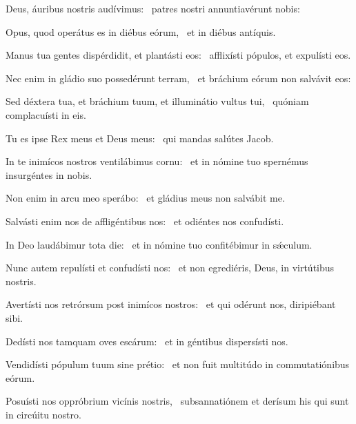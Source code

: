 \item Deus, áuribus nostris audívimus:~\psstar{} patres nostri annuntiavérunt nobis:

\item Opus, quod operátus es in diébus eórum,~\psstar{} et in diébus antíquis.

\item Manus tua gentes dispérdidit, et plantásti eos:~\psstar{} afflixísti pópulos, et expulísti eos.

\item Nec enim in gládio suo possedérunt terram,~\psstar{} et bráchium eórum non salvávit eos:

\item Sed déxtera tua, et bráchium tuum, et illuminátio vultus tui,~\psstar{} quóniam complacuísti in eis.

\item Tu es ipse Rex meus et Deus meus:~\psstar{} qui mandas salútes Jacob.

\item In te inimícos nostros ventilábimus cornu:~\psstar{} et in nómine tuo spernémus insurgéntes in nobis.

\item Non enim in arcu meo sperábo:~\psstar{} et gládius meus non salvábit me.

\item Salvásti enim nos de affligéntibus nos:~\psstar{} et odiéntes nos confudísti.

\item In Deo laudábimur tota die:~\psstar{} et in nómine tuo confitébimur in sǽculum.

\item Nunc autem repulísti et confudísti nos:~\psstar{} et non egrediéris, Deus, in virtútibus nostris.

\item Avertísti nos retrórsum post inimícos nostros:~\psstar{} et qui odérunt nos, diripiébant sibi.

\item Dedísti nos tamquam oves escárum:~\psstar{} et in géntibus dispersísti nos.

\item Vendidísti pópulum tuum sine prétio:~\psstar{} et non fuit multitúdo in commutatiónibus eórum.

\item Posuísti nos oppróbrium vicínis nostris,~\psstar{} subsannatiónem et derísum his qui sunt in circúitu nostro.

